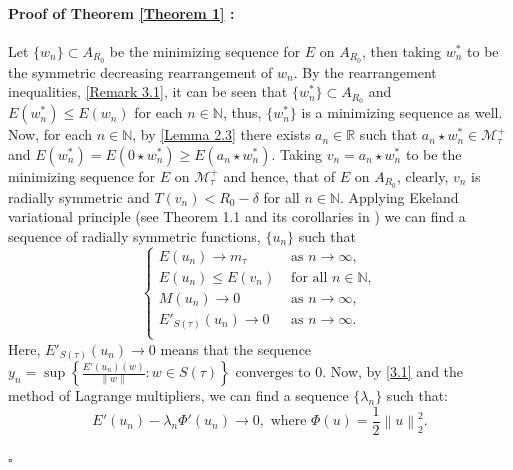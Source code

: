 \documentclass[11pt]{article}
\numberwithin{equation}{section}
\numberwithin{mytheorem}{section}
\newenvironment{myproof}[2] {\paragraph{Proof of {#1} {#2} :}}{\hfill$\square$}
\begin{document}
		\begin{myproof}{Theorem}{\ref{Theorem 1}}
			Let $\{w_n\}\subset A_{R_0}$ be the minimizing sequence for $E$ on $A_{R_0}$, then taking $w_n^*$ to be the symmetric decreasing rearrangement of $w_n$. By the rearrangement inequalities, \autoref{Remark 3.1}, it can be seen that $\{w_n^*\}\subset A_{R_0}$ and $E(w_n^*)\leq E(w_n)$ for each $n\in \mathbb{N}$, thus, $\{w_n^*\}$ is a minimizing sequence as well. Now, for each $n\in \mathbb{N}$, by \autoref{Lemma 2.3} there exists $a_{n}\in \mathbb{R}$ such that $a_n\star w_n^*\in \mathcal{M}_{\tau}^+$ and $E(w_n^*)=E(0\star w_n^*)\geq E(a_n\star w_n^*)$.
			Taking $v_n=a_n\star w_n^*$ to be the minimizing sequence for $E$ on $\mathcal{M}_{\tau}^+$ and hence, that of $E$ on $A_{R_0}$, clearly, $v_n$ is radially symmetric and $T(v_n)<R_0-\delta$ for all $n\in \mathbb{N}$.
			Applying Ekeland variational principle 
			(see Theorem 1.1 and its corollaries in \cite{Ghoussoub}) we can find a sequence of radially symmetric functions, $\{u_n\}$
			such that\begin{equation}\label{3.1}
				\left\{
				\begin{array}{cc}
					E(u_n)\rightarrow m_{\tau} & \text{ as } n\rightarrow \infty,\\
					E(u_n)\leq E(v_n) & \text{ for all } n\in \mathbb{N},\\
					M(u_n) \rightarrow 0 & \text{ as } n\rightarrow \infty,\\
					E'_{S(\tau)}(u_n) \rightarrow 0 & \text{ as } n\rightarrow \infty.\\
				\end{array}
				\right.
			\end{equation}
			Here, $E'_{S(\tau)}(u_n) \rightarrow 0$ means that the sequence  $y_n=\sup\left\{\frac{E'(u_n)(w)}{\left\| w \right\|}: w\in S({\tau})\right\}$ converges to $0$. Now, by \eqref{3.1} and the method of Lagrange multipliers, we can find a sequence $\{\lambda_n\}$ such that:
			\begin{equation}\label{3.2}
				E'(u_n)-\lambda_n\Phi'(u_n) \rightarrow 0, \text{ where } \Phi(u)=\frac{1}{2}\left\| u \right\|_2^2.
			\end{equation}

\end{myproof}
\end{document}
